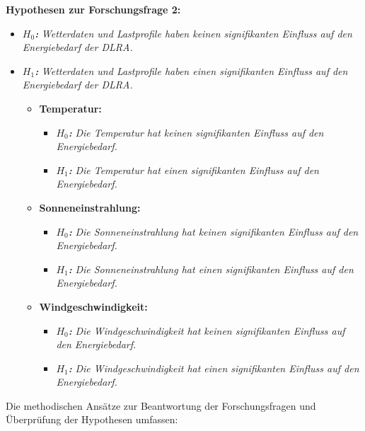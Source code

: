 \textbf{Hypothesen zur Forschungsfrage 2:}
\begin{itemize}[label={--}]
	\item \textbf{\textit{$H_0$:}} \textit{Wetterdaten und Lastprofile haben keinen signifikanten Einfluss auf den Energiebedarf der DLRA.}
	\item \textbf{\textit{$H_1$:}} \textit{Wetterdaten und Lastprofile haben einen signifikanten Einfluss auf den Energiebedarf der DLRA.}\\
	\begin{itemize}
		\item \textbf{Temperatur:} 
		\begin{itemize}
			\item \textbf{\textit{$H_0$:}} \textit{Die Temperatur hat keinen signifikanten Einfluss auf den Energiebedarf.}
			\item \textbf{\textit{$H_1$:}} \textit{Die Temperatur hat einen signifikanten Einfluss auf den Energiebedarf.}
		\end{itemize}
		\item \textbf{Sonneneinstrahlung:}
		\begin{itemize}
			\item \textbf{\textit{$H_0$:}} \textit{Die Sonneneinstrahlung hat keinen signifikanten Einfluss auf den Energiebedarf.}
			\item \textbf{\textit{$H_1$:}} \textit{Die Sonneneinstrahlung hat einen signifikanten Einfluss auf den Energiebedarf.}
		\end{itemize}
		\item \textbf{Windgeschwindigkeit:}
		\begin{itemize}
			\item \textbf{\textit{$H_0$:}} \textit{Die Windgeschwindigkeit hat keinen signifikanten Einfluss auf den Energiebedarf.}
			\item \textbf{\textit{$H_1$:}} \textit{Die Windgeschwindigkeit hat einen signifikanten Einfluss auf den Energiebedarf.}\\
		\end{itemize}
	\end{itemize}
\end{itemize}

Die methodischen Ansätze zur Beantwortung der Forschungsfragen und Überprüfung der Hypothesen umfassen:

